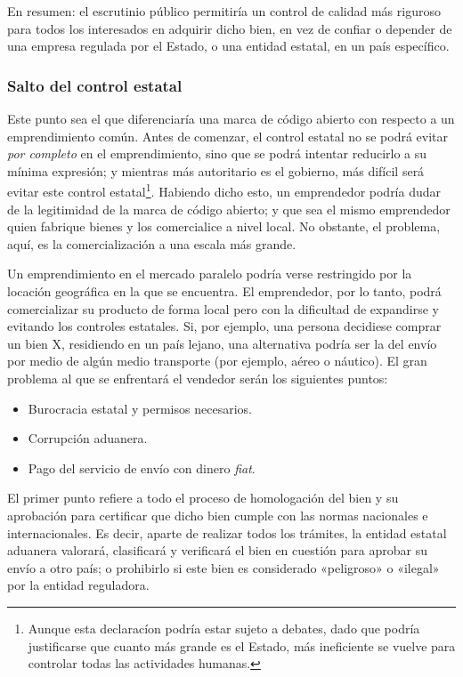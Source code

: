 \documentclass[12pt,a4paper]{article}
\begin{document}
En resumen: el escrutinio público permitiría un control de calidad más riguroso para todos los interesados en adquirir dicho bien, en vez de confiar o depender de una empresa regulada por el Estado, o una entidad estatal, en un país específico.

\subsubsection{Salto del control estatal}
Este punto sea el que diferenciaría una marca de código abierto con respecto a un emprendimiento común. Antes de comenzar, el control estatal no se podrá evitar \textit{por completo} en el emprendimiento, sino que se podrá intentar reducirlo a su mínima expresión; y mientras más autoritario es el gobierno, más difícil será evitar este control estatal\footnote{Aunque esta declaracíon podría estar sujeto a debates, dado que podría justificarse que cuanto más grande es el Estado, más ineficiente se vuelve para controlar todas las actividades humanas.}. Habiendo dicho esto, un emprendedor podría dudar de la legitimidad de la marca de código abierto; y que sea el mismo emprendedor quien fabrique bienes y los comercialice a nivel local. No obstante, el problema, aquí, es la comercialización a una escala más grande.

Un emprendimiento en el mercado paralelo podría verse restringido por la locación geográfica en la que se encuentra. El emprendedor, por lo tanto, podrá comercializar su producto de forma local pero con la dificultad de expandirse y evitando los controles estatales. Si, por ejemplo, una persona decidiese comprar un bien X, residiendo en un país lejano, una alternativa podría ser la del envío por medio de algún medio transporte (por ejemplo, aéreo o náutico). El gran problema al que se enfrentará el vendedor serán los siguientes puntos:

\begin{itemize}
\item Burocracia estatal y permisos necesarios.
\item Corrupción aduanera.
\item Pago del servicio de envío con dinero \textit{fiat}.
\end{itemize}

El primer punto refiere a todo el proceso de homologación del bien y su aprobación para certificar que dicho bien cumple con las normas nacionales e internacionales. Es decir, aparte de realizar todos los trámites, la entidad estatal aduanera valorará, clasificará y verificará el bien en cuestión para aprobar su envío a otro país; o prohibirlo si este bien es considerado «peligroso» o «ilegal» por la entidad reguladora.
\end{document}
